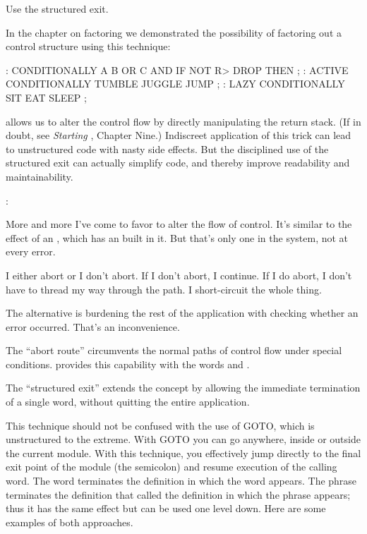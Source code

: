 \begin{tip}
Use the structured exit.
\end{tip}
In the chapter on factoring we demonstrated the possibility of factoring
out a control structure using this technique:

\begin{Code}
: CONDITIONALLY   A B OR  C AND  IF  NOT R> DROP  THEN ;
: ACTIVE   CONDITIONALLY   TUMBLE JUGGLE JUMP ;
: LAZY   CONDITIONALLY  SIT  EAT  SLEEP ;
\end{Code}
\Forth{} allows us to alter the control flow by directly manipulating the
return stack. (If in doubt, see \emph{Starting \Forth{}}, Chapter Nine.)
Indiscreet application of this trick can lead to unstructured code with nasty
side effects. But the disciplined use of the structured exit can actually
simplify code, and thereby improve readability and maintainability.

\begin{interview}
:
\begin{tfquot}
More and more I've come to favor  to alter the flow of
control.  It's similar to the effect of an , which has an
 built in it. But that's only one  in the system, not at every error.

I either abort or I don't abort. If I don't abort, I continue. If I do
abort, I don't have to thread my way through the path. I short-circuit the
whole thing.

The alternative is burdening the rest of the application with checking
whether an error occurred. That's an inconvenience.
\end{tfquot}
\end{interview}
The ``abort route'' circumvents the normal paths of control flow under
special conditions. \Forth{} provides this capability with the words
 and .

The ``structured exit'' extends the concept by allowing the immediate
termination of a single word, without quitting the entire application.

This technique should not be confused with the use of GOTO, which is
unstructured to the extreme. With GOTO you can go anywhere, inside or
outside the current module. With this technique, you effectively jump
directly to the final exit point of the module (the semicolon) and resume
execution of the calling word.
%
The word  terminates the definition in which the word
appears.  The phrase  terminates the definition that
called the definition in which the phrase appears; thus it has the same
effect but can be used one level down. Here are some examples of both
approaches.

